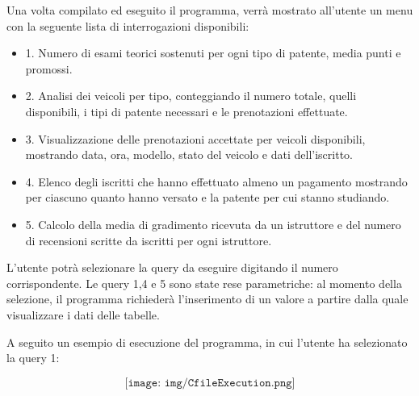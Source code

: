 \documentclass[10pt,twoside]{article}
\begin{document}
{{        Una volta compilato ed eseguito il programma, verrà mostrato all’utente un menu con la seguente lista di interrogazioni disponibili:
        \begin{itemize}
            \item 1. Numero di esami teorici sostenuti per ogni tipo di patente, media punti e promossi.
            \item 2. Analisi dei veicoli per tipo, conteggiando il numero totale, quelli disponibili, i tipi di patente necessari e le prenotazioni effettuate.
            \item 3. Visualizzazione delle prenotazioni accettate per veicoli disponibili, mostrando data, ora, modello, stato del veicolo e dati dell’iscritto.
            \item 4. Elenco degli iscritti che hanno effettuato almeno un pagamento mostrando per ciascuno quanto hanno versato e la patente per cui stanno studiando.
            \item 5. Calcolo della media di gradimento ricevuta da un istruttore e del numero di recensioni scritte da iscritti per ogni istruttore.
        \end{itemize}
         L’utente potrà selezionare la query da eseguire digitando il numero corrispondente. Le query 1,4 e 5 sono state rese parametriche: al momento della selezione, il programma richiederà l’inserimento di un valore a partire dalla quale visualizzare i dati delle tabelle. 

         A seguito un esempio di esecuzione del programma, in cui l’utente ha selezionato la query 1:

        $$
        \texttt{[image: img/CfileExecution.png]}
        $$
    }
        

}
\end{document}
